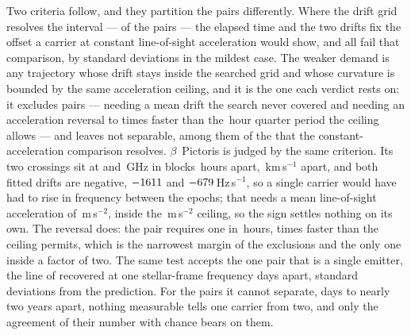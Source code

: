 Two criteria follow, and they partition the pairs differently. Where the drift
grid resolves the interval --- \TjNPower{} of the \TjNPair{} pairs --- the
elapsed time and the two drifts fix the offset a carrier at constant
line-of-sight acceleration would show, and all \TjNPower{} fail that
comparison, by \TjSigMin{} standard deviations in the mildest case. The weaker
demand is any trajectory whose drift stays inside the searched grid and whose
curvature is bounded by the same acceleration ceiling, and it is the one each
verdict rests on: it excludes \TjNExcl{} pairs ---
\TjNExclGrid{} needing a mean drift the search never covered and
\TjNExclTau{} needing an acceleration reversal \TjRatioLo{} to \TjRatioHi{}
times faster than the \TjTauOrbH\,hour quarter period the ceiling allows ---
and leaves \TjNOpen{} not separable, among them \TjNPowerOpen{} of the
\TjNPower{} that the constant-acceleration comparison resolves.
$\beta$~Pictoris is judged by the same criterion. Its two crossings sit at
\TjBpNuLo{} and \TjBpNuHi\,GHz in blocks \TjBpDtH\,hours apart,
\TjBpDvKms\,km\,s$^{-1}$ apart, and both fitted drifts are negative,
$-1611$ and $-679$\,Hz\,s$^{-1}$, so a single carrier would have
had to rise in frequency between the epochs; that needs a mean line-of-sight
acceleration of \TjBpAccelReq\,m\,s$^{-2}$, inside the
\WdAGrid\,m\,s$^{-2}$ ceiling, so the sign settles nothing on its own. The
reversal does: the pair requires one in \TjBpTauH\,hours, \TjBpRatio{} times
faster than the ceiling permits, which is the narrowest margin of the
\TjNExcl{} exclusions and the only one inside a factor of two. The same test
accepts the one pair that is a single emitter, the \TjCtlLine{} line of
\TjCtlStar{} recovered at one stellar-frame frequency \TjCtlDtD{} days apart,
\TjCtlNSig{} standard deviations from the prediction. For the \TjNOpen{} pairs
it cannot
separate, \TjDtOpenMinD{} days to nearly two years apart, nothing measurable
tells one carrier from two, and only the agreement of their number with
chance bears on them.

